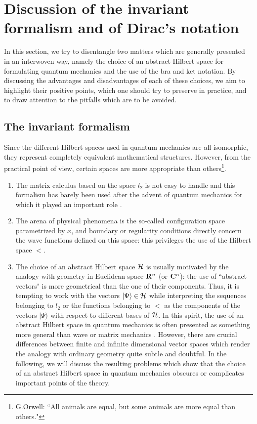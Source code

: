 \documentclass[a4wide,12pt]{report}
\begin{document}
 
 
 
 
\chapter{Discussion of the invariant formalism 
and of Dirac's notation}

In this section, we try to disentangle two matters
which are generally presented in an interwoven way, 
namely the choice of an abstract Hilbert space 
for formulating quantum mechanics
and 
the use of the bra and ket notation.
By discussing the advantages and disadvantages
of each of these choices, we aim to 
highlight their positive points, which one should try 
to preserve in practice, and 
to draw attention to the pitfalls 
which are to be avoided.  


\section{The invariant formalism}

Since the different Hilbert spaces used in quantum mechanics
are all isomorphic, they represent  
completely equivalent mathematical structures. 
However, from the practical point of view, certain spaces are 
more appropriate than others\footnote{G.Orwell:
``All animals are equal, but some animals are more equal
than others."}.
\begin{enumerate}
\item
The matrix calculus based on the space $l_2$
is not easy to handle and this formalism has barely been used after 
the advent of quantum mechanics for which it played an 
important role \cite{vdw}.
\item
The arena of physical phenomena is the so-called 
configuration space parametrized by $x$, and boundary or regularity
conditions directly concern the 
wave functions defined on this space: 
this privileges the use of the Hilbert space $\lt$. 
\item
The choice of an abstract Hilbert space ${\cal H}$ is usually motivated by  
the analogy with geometry in Euclidean space 
${\bf R}^n$ (or ${\bf C}^n$): the use of ``abstract vectors" is more geometrical
than the one of their components. Thus, it is tempting to work with the 
vectors $ | \Psi \rangle \in {\cal H}$
while interpreting the sequences belonging to $l_2$ or the functions 
belonging to $\lt$ as the components of the vectors 
$|\Psi \rangle $ with respect to different bases of ${\cal H}$.
In this spirit, the use of an abstract Hilbert space in quantum mechanics 
is often presented as something  more general than wave or matrix mechanics 
\cite{ct}.
However, there are crucial differences between finite and
infinite dimensional vector spaces which render the analogy with 
ordinary geometry quite subtle and doubtful.  
In the following, we will discuss the resulting problems 
which show that the choice of an abstract Hilbert space in 
quantum mechanics obscures or complicates 
important points of the theory. 
\end{enumerate}
 
\end{document}
